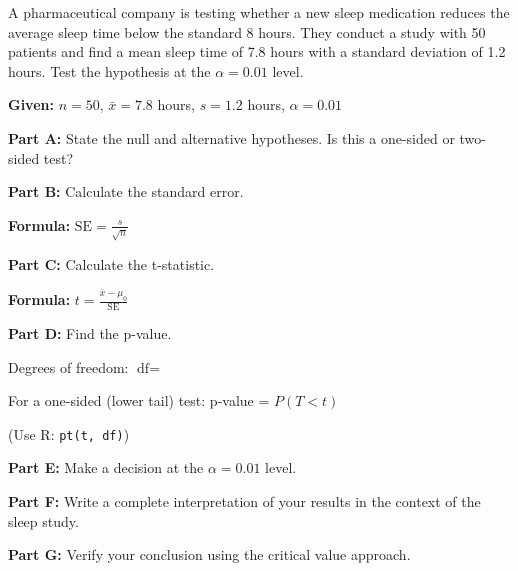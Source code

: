 \documentclass[11pt]{article}
\begin{document}
A pharmaceutical company is testing whether a new sleep medication reduces the average sleep time below the standard 8 hours. They conduct a study with 50 patients and find a mean sleep time of 7.8 hours with a standard deviation of 1.2 hours. Test the hypothesis at the $\alpha = 0.01$ level.

\textbf{Given:} $n = 50$, $\bar{x} = 7.8$ hours, $s = 1.2$ hours, $\alpha = 0.01$

\vspace{6pt}

\textbf{Part A:} State the null and alternative hypotheses. Is this a one-sided or two-sided test?

\vspace{3cm}

\textbf{Part B:} Calculate the standard error.

\vspace{0.3cm}

\textbf{Formula:} $\text{SE} = \frac{s}{\sqrt{n}}$

\vspace{2cm}

\textbf{Part C:} Calculate the t-statistic.

\vspace{0.3cm}

\textbf{Formula:} $t = \frac{\bar{x} - \mu_0}{\text{SE}}$

\vspace{2cm}

\textbf{Part D:} Find the p-value.

\vspace{0.3cm}

Degrees of freedom: $\text{df} = $

\vspace{0.5cm}

For a one-sided (lower tail) test: p-value = $P(T < t)$

(Use R: \texttt{pt(t, df)})

\vspace{2cm}

\textbf{Part E:} Make a decision at the $\alpha = 0.01$ level.

\vspace{2cm}

\textbf{Part F:} Write a complete interpretation of your results in the context of the sleep study.

\vspace{3cm}

\textbf{Part G:} Verify your conclusion using the critical value approach.
\end{document}
